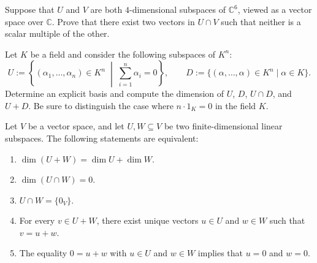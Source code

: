 \begin{exercise}
\label{exc:intersection_four_dim_subspaces}
Suppose that $U$ and $V$ are both $4$-dimensional subspaces of $\mathbb{C}^6$, viewed as a vector space over $\mathbb{C}$. Prove that there exist two vectors in $U \cap V$ such that neither is a scalar multiple of the other.
\end{exercise}

\begin{exercise}
\label{exc:hyperplane_and_diagonal_subspaces}
Let $K$ be a field and consider the following subspaces of $K^n$:
\[
U := \left\{ (\alpha_1, \dots, \alpha_n) \in K^n \;\middle|\; \sum_{i=1}^n \alpha_i = 0 \right\}, \qquad
D := \{(\alpha, \dots, \alpha) \in K^n \mid \alpha \in K\}.
\]
Determine an explicit basis and compute the dimension of $U$, $D$, $U \cap D$, and $U + D$. Be sure to distinguish the case where $n \cdot 1_K = 0$ in the field $K$.
\end{exercise}

\begin{corollary}
\label{cor:trivial_intersection}
Let $V$ be a vector space, and let $U, W \subseteq V$ be two finite-di\-men\-sional linear subspaces. The following statements are equivalent:
\begin{enumerate}[label=\textbf{(\alph*)}]
    \item $\dim(U + W) = \dim U + \dim W$.
    \item $\dim(U \cap W) = 0$.
    \item $U \cap W = \{0_V\}$.
    \item For every $v \in U + W$, there exist unique vectors $u \in U$ and $w \in W$ such that $v = u + w$.
    \item The equality $0 = u + w$ with $u \in U$ and $w \in W$ implies that $u = 0$ and $w = 0$.
\end{enumerate}
\end{corollary}

